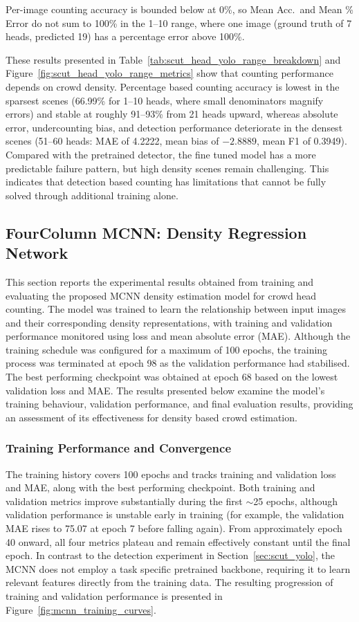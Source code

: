 Per-image counting accuracy is bounded below at 0\%, so Mean Acc.\ and Mean \% Error do not sum to 100\% in the 1--10 range, where one image (ground truth of 7 heads, predicted 19) has a percentage error above 100\%.

These results presented in Table~\ref{tab:scut_head_yolo_range_breakdown} and Figure~\ref{fig:scut_head_yolo_range_metrics} show that counting performance depends on crowd density. Percentage based counting accuracy is lowest in the sparsest scenes (66.99\% for 1--10 heads, where small denominators magnify errors) and stable at roughly 91--93\% from 21 heads upward, whereas absolute error, undercounting bias, and detection performance deteriorate in the densest scenes (51--60 heads: MAE of 4.2222, mean bias of $-2.8889$, mean F1 of 0.3949). Compared with the pretrained detector, the fine tuned model has a more predictable failure pattern, but high density scenes remain challenging. This indicates that detection based counting has limitations that cannot be fully solved through additional training alone.

\subsection{FourColumn MCNN: Density Regression Network}
\label{sec:mcnn}

This section reports the experimental results obtained from training and evaluating the proposed MCNN density estimation model for crowd head counting. The model was trained to learn the relationship between input images and their corresponding density representations, with training and validation performance monitored using loss and mean absolute error (MAE). Although the training schedule was configured for a maximum of 100 epochs, the training process was terminated at epoch 98 as the validation performance had stabilised. The best performing checkpoint was obtained at epoch 68 based on the lowest validation loss and MAE. The results presented below examine the model's training behaviour, validation performance, and final evaluation results, providing an assessment of its effectiveness for density based crowd estimation.

\subsubsection{Training Performance and Convergence}

The training history covers 100 epochs and tracks training and validation loss and MAE, along with the best performing checkpoint. Both training and validation metrics improve substantially during the first $\sim$25 epochs, although validation performance is unstable early in training (for example, the validation MAE rises to 75.07 at epoch 7 before falling again). From approximately epoch 40 onward, all four metrics plateau and remain effectively constant until the final epoch. In contrast to the detection experiment in Section~\ref{sec:scut_yolo}, the MCNN does not employ a task specific pretrained backbone, requiring it to learn relevant features directly from the training data. The resulting progression of training and validation performance is presented in Figure~\ref{fig:mcnn_training_curves}.


